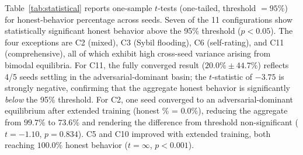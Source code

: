 Table~\ref{tab:statistical} reports one-sample $t$-tests (one-tailed,
threshold $= 95\%$) for honest-behavior percentage across seeds.
Seven of the 11 configurations show statistically significant honest behavior
above the 95\% threshold ($p < 0.05$).  The four exceptions are C2 (mixed),
C3 (Sybil flooding), C6 (self-rating), and C11 (comprehensive), all of which
exhibit high cross-seed variance arising from bimodal equilibria.  For C11,
the fully converged result ($20.0\% \pm 44.7\%$) reflects 4/5 seeds settling
in the adversarial-dominant basin; the $t$-statistic of $-3.75$ is strongly
negative, confirming that the aggregate honest behavior is significantly
\emph{below} the 95\% threshold.  For C2, one seed converged to an
adversarial-dominant equilibrium after extended training (honest \% = $0.0\%$),
reducing the aggregate from $99.7\%$ to $73.6\%$ and rendering the
difference from threshold non-significant ($t = -1.10$, $p = 0.834$).
C5 and C10 improved with extended training, both reaching $100.0\%$ honest
behavior ($t = \infty$, $p < 0.001$).


